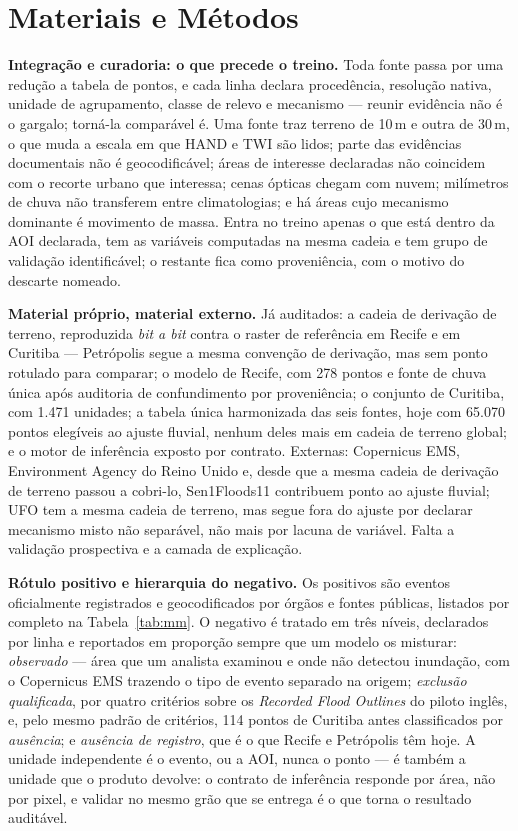 \documentclass[conference]{IEEEtran}
\begin{document}
\section{Materiais e Métodos}

\textbf{Integração e curadoria: o que precede o treino.} Toda fonte passa por
uma redução a tabela de pontos, e cada linha declara procedência, resolução
nativa, unidade de agrupamento, classe de relevo e mecanismo --- reunir
evidência não é o gargalo; torná-la comparável é. Uma fonte traz terreno de
10\,m e outra de 30\,m, o que muda a escala em que HAND e TWI são lidos; parte
das evidências documentais não é geocodificável; áreas de interesse declaradas
não coincidem com o recorte urbano que interessa; cenas ópticas chegam com
nuvem; milímetros de chuva não transferem entre climatologias; e há áreas cujo
mecanismo dominante é movimento de massa. Entra no treino apenas o que está
dentro da AOI declarada, tem as variáveis computadas na mesma cadeia e tem
grupo de validação identificável; o restante fica como proveniência, com o
motivo do descarte nomeado.

\textbf{Material próprio, material externo.} Já auditados: a cadeia de derivação
de terreno, reproduzida \emph{bit a bit} contra o raster de referência em Recife
e em Curitiba --- Petrópolis segue a mesma convenção de derivação, mas sem ponto
rotulado para comparar; o modelo de Recife, com 278 pontos e fonte de chuva
única após auditoria de confundimento por proveniência; o conjunto de
Curitiba, com 1.471 unidades; a tabela única harmonizada das seis fontes, hoje
com 65.070 pontos elegíveis ao ajuste fluvial, nenhum deles mais em cadeia de
terreno global; e o motor de inferência exposto por contrato. Externas:
Copernicus EMS, Environment Agency do Reino Unido e, desde que a mesma cadeia
de derivação de terreno passou a cobri-lo, Sen1Floods11 contribuem ponto ao
ajuste fluvial; UFO tem a mesma cadeia de terreno, mas segue fora do ajuste
por declarar mecanismo misto não separável, não mais por lacuna de variável.
Falta a validação prospectiva e a camada de explicação.

\textbf{Rótulo positivo e hierarquia do negativo.} Os positivos são eventos
oficialmente registrados e geocodificados por órgãos e fontes públicas,
listados por completo na Tabela~\ref{tab:mm}. O
negativo é tratado em três níveis, declarados por linha e reportados em proporção
sempre que um modelo os misturar: \emph{observado} --- área que um analista
examinou e onde não detectou inundação, com o Copernicus EMS trazendo o tipo de
evento separado na origem; \emph{exclusão qualificada}, por quatro critérios
sobre os \emph{Recorded Flood Outlines} do piloto inglês, e, pelo mesmo
padrão de critérios, 114 pontos de Curitiba antes classificados por
\emph{ausência}; e \emph{ausência de registro}, que é o que Recife e
Petrópolis têm hoje. A unidade
independente é o evento, ou a AOI, nunca o ponto --- é também a unidade que o
produto devolve: o contrato de inferência responde por área, não por pixel, e
validar no mesmo grão que se entrega é o que torna o resultado auditável.
\end{document}
